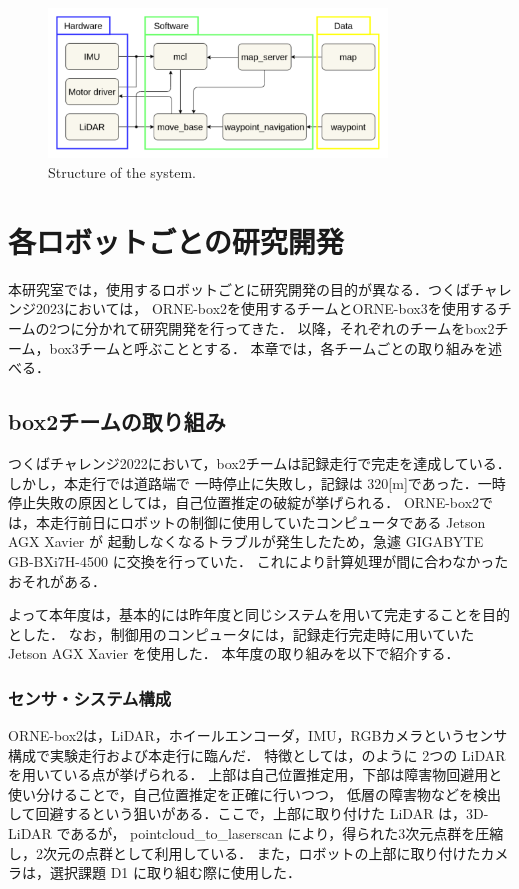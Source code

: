 \documentclass[twocolumn, 9pt]{jsproceedings}
\begin{document}
\begin{figure}[h!]
  \centering
  \includegraphics[width=90mm]{fig/software.pdf}
  \caption{Structure of the system.}
  \label{fig:soft-fig}
\end{figure}

\vspace*{2mm}

\section{各ロボットごとの研究開発}
本研究室では，使用するロボットごとに研究開発の目的が異なる．つくばチャレンジ2023においては，
ORNE-box2を使用するチームとORNE-box3を使用するチームの2つに分かれて研究開発を行ってきた．
以降，それぞれのチームをbox2チーム，box3チームと呼ぶこととする．
本章では，各チームごとの取り組みを述べる．

\subsection{box2チームの取り組み}
つくばチャレンジ2022において，box2チームは記録走行で完走を達成している．しかし，本走行では道路端で
一時停止に失敗し，記録は 320[m]であった．一時停止失敗の原因としては，自己位置推定の破綻が挙げられる．
ORNE-box2では，本走行前日にロボットの制御に使用していたコンピュータである Jetson AGX Xavier が
起動しなくなるトラブルが発生したため，急遽 GIGABYTE GB-BXi7H-4500 に交換を行っていた．
これにより計算処理が間に合わなかったおそれがある．

よって本年度は，基本的には昨年度と同じシステムを用いて完走することを目的とした．
なお，制御用のコンピュータには，記録走行完走時に用いていた Jetson AGX Xavier を使用した．
本年度の取り組みを以下で紹介する．

\subsubsection{センサ・システム構成}
ORNE-box2は，LiDAR，ホイールエンコーダ，IMU，RGBカメラというセンサ構成で実験走行および本走行に臨んだ．
特徴としては，のように 2つの LiDAR を用いている点が挙げられる．
上部は自己位置推定用，下部は障害物回避用と使い分けることで，自己位置推定を正確に行いつつ，
低層の障害物などを検出して回避するという狙いがある．ここで，上部に取り付けた LiDAR は，3D-LiDAR であるが，
pointcloud\_to\_laserscan\cite{pointcloud} により，得られた3次元点群を圧縮し，2次元の点群として利用している．
また，ロボットの上部に取り付けたカメラは，選択課題 D1 に取り組む際に使用した．
\end{document}
